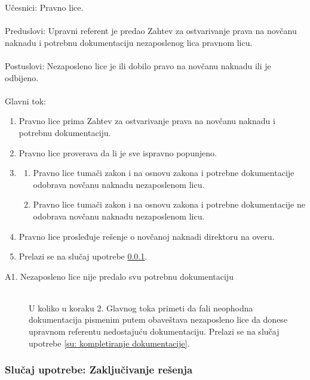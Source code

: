 \noindent Učesnici: Pravno lice.
\\
\\ Preduslovi: Upravni referent je predao Zahtev za ostvarivanje prava na novčanu naknadu i potrebnu dokumentaciju nezaposlenog lica pravnom licu.
\\
\\ Postuslovi: Nezaposleno lice je ili dobilo pravo na novčanu naknadu ili je odbijeno.
\\
\\ Glavni tok:
\begin{enumerate}
\item Pravno lice prima Zahtev za ostvarivanje prava na novčanu naknadu i potrebnu dokumentaciju.
\item Pravno lice proverava da li je sve ispravno popunjeno.
\item \begin{enumerate}
\item Pravno lice tumači zakon i na osnovu zakona i potrebne dokumentacije odobrava novčanu naknadu nezaposlenom licu.
\item Pravno lice tumači zakon i na osnovu zakona i potrebne dokumentacije ne odobrava novčanu naknadu nezaposlenom licu.
\end{enumerate}
\item Pravno lice prosleđuje rešenje o novčanoj naknadi direktoru na overu.
\item Prelazi se na slu\v caj upotrebe \ref{su: gde je pecat}.
\end{enumerate}

\begin{description}
\item [A1. Nezaposleno lice nije predalo svu potrebnu dokumentaciju] ~\\
	U koliko u koraku 2. Glavnog toka primeti da fali neophodna dokumentacija pismenim putem obaveštava nezaposleno lice da donese upravnom referentu nedostajuću dokumentaciju. Prelazi se na slučaj upotrebe \ref{su: kompletiranje dokumentacije}.
\end{description}


\subsubsection{Slu\v caj upotrebe: Zaključivanje rešenja}
\label{su: gde je pecat}

